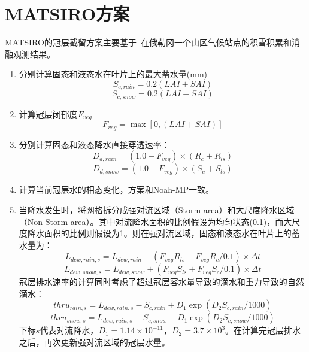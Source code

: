 \section{MATSIRO方案}
MATSIRO的冠层截留方案主要基于~\cite{storck2002measurement}在俄勒冈一个山区气候站点的积雪积累和消融观测结果。
\begin{enumerate}
\item 分别计算固态和液态水在叶片上的最大蓄水量(mm)\\
\begin{equation}
S_{c,rain}=0.2\left(LAI+SAI\right)
\end{equation}
\begin{equation}
S_{c,snow}=0.2\left(LAI+SAI\right)
\end{equation}

\item 计算冠层闭郁度$F_{veg}$
\begin{equation}
F_{veg} = \max\left[0, \left(LAI+SAI\right)\right]
\end{equation}

\item 分别计算固态和液态降水直接穿透速率：
\begin{equation}
D_{d,rain}=\left(1.0-F_{veg}\right) \times (R_{c}+R_{ls})
\end{equation}
\begin{equation}
D_{d,snow}=\left(1.0-F_{veg}\right) \times (S_{c}+S_{ls})
\end{equation}
\item 计算当前冠层水的相态变化，方案和Noah-MP一致。

\item 当降水发生时，将网格拆分成强对流区域（Storm area）和大尺度降水区域（Non-Storm area）。其中对流降水面积的比例假设为均匀状态(0.1)，而大尺度降水面积的比例则假设为1。则在强对流区域，固态和液态水在叶片上的蓄水量为：
\begin{equation}
L_{dew,rain,s}=L_{dew,rain}+(F_{veg}R_{ls}+F_{veg}R_{c}/0.1)\times \Delta{t}
\end{equation}
\begin{equation}
L_{dew,snow,s}=L_{dew,snow}+(F_{veg}S_{ls}+F_{veg}S_{c}/0.1)\times \Delta{t}
\end{equation}
冠层排水速率的计算同时考虑了超过冠层容水量导致的滴水和重力导致的自然滴水：
\begin{equation}
thru_{rain,s}=L_{dew,rain,s}-S_{c,rain}+D_{1} \exp \left(D_{2} S_{c,rain}/1000\right)
\end{equation}
\begin{equation}
thru_{snow,s}=L_{dew,rain,s}-S_{c,snow}+D_{1} \exp \left(D_{2} S_{c,snow}/1000\right)
\end{equation}
下标$s$代表对流降水，$D_{1}=1.14 \times 10^{-11}$，$D_{2}=3.7 \times 10^{3}$。在计算完冠层排水之后，再次更新强对流区域的冠层水量。


\end{enumerate}

